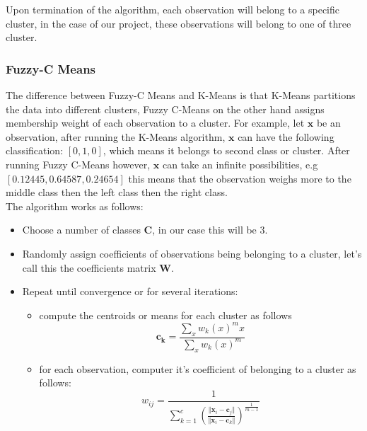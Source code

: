 \begin{multicols*}{2}
    Upon termination of the algorithm, each observation will belong to a specific cluster, in the case of our project, these observations will belong to one of three cluster.

    \subsubsection{Fuzzy-C Means}
    The difference between Fuzzy-C Means and K-Means is that K-Means partitions the data into different clusters, Fuzzy C-Means on the other hand assigns membership weight of each observation to a cluster. For example, let $\mathbf{x}$ be an observation, after running the K-Means algorithm, $\mathbf{x}$ can have the following classification: $[0 , 1 , 0]$, which means it belongs to second class or cluster. After running Fuzzy C-Means however, $\mathbf{x}$ can take an infinite possibilities, e.g $[0.12445 , 0.64587 , 0.24654]$ this means that the observation weighs more to the middle class then the left class then the right class.\\
    The algorithm works as follows:
    \begin{itemize}
        \item Choose a number of classes $\mathbf{C}$, in our case this will be 3.
        \item Randomly assign coefficients of observations being belonging to a cluster, let's call this the coefficients matrix $\mathbf{W}$.
        \item Repeat until convergence or for several iterations:
            \begin{itemize}
                \item compute the centroids or means for each cluster as follows
                \begin{equation}
                    \mathbf{c_k} = \frac{\sum_xw_k(x)^mx}{\sum_xw_k(x)^m}
                \end{equation}
                \item for each observation, computer it's coefficient of belonging to a cluster as follows:
                \begin{equation}
                    w_{ij} = \frac{1}{\sum_{k=1}^c(\frac{\Vert\mathbf{x}_i-\mathbf{c}_j \Vert}{\Vert\mathbf{x}_i-\mathbf{c}_k \Vert})^{\frac{1}{m-1}}}
                \end{equation}
            \end{itemize}
    \end{itemize}


\end{multicols*}

